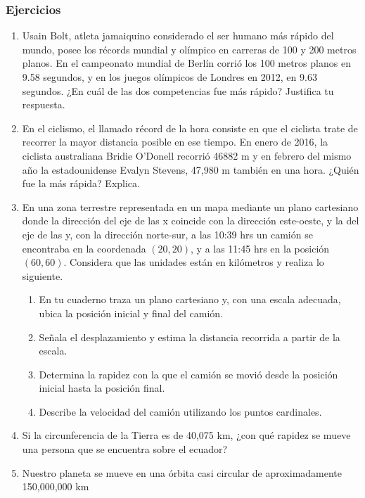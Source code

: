 \documentclass[11pt]{book}
\begin{document}
\subsubsection{Ejercicios}
\begin{enumerate}
    \item Usain Bolt, atleta jamaiquino considerado el ser humano más rápido del mundo,
          posee los récords mundial y olímpico en carreras de 100 y 200 metros planos. En el
          campeonato mundial de Berlín corrió los 100 metros planos en 9.58 segundos, y en los
          juegos olímpicos de Londres en 2012, en 9.63 segundos. ¿En cuál de las dos competencias
          fue más rápido? Justifica tu respuesta.
    \item En el ciclismo, el llamado récord de la hora consiste en que el ciclista trate de
          recorrer la mayor distancia posible en ese tiempo. En enero de 2016, la ciclista australiana
          Bridie O'Donell recorrió 46882 m y en febrero del mismo año la estadounidense Evalyn Stevens,
          47,980 m también en una hora. ¿Quién fue la más rápida? Explica.
    \item En una zona terrestre representada en un mapa mediante un plano cartesiano donde
          la dirección del eje de las x coincide con la dirección este-oeste, y la del eje de las y,
          con la dirección norte-sur, a las 10:39 hrs un camión se encontraba en la coordenada
          $(20, 20)$, y a las 11:45 hrs en la posición $(60, 60)$. Considera que las unidades están
          en kilómetros y realiza lo siguiente.
          \begin{enumerate}
              \item En tu cuaderno traza un plano cartesiano y, con una escala adecuada, ubica la
                    posición inicial y final del camión.
              \item Señala el desplazamiento y estima la distancia recorrida a partir de la escala.
              \item Determina la rapidez con la que el camión se movió desde la posición inicial
                    hasta la posición final.
              \item Describe la velocidad del camión utilizando los puntos cardinales.
          \end{enumerate}
    \item Si la circunferencia de la Tierra es de 40,075 km, ¿con qué rapidez se mueve una persona
          que se encuentra sobre el ecuador?
    \item Nuestro planeta se mueve en una órbita casi circular de aproximadamente 150,000,000 km

\end{enumerate}
\end{document}
